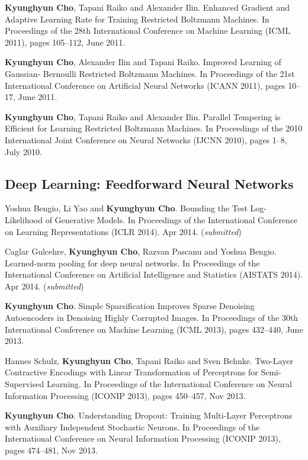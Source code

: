 \documentclass[11pt, oneside]{essay}
\begin{document}
\textbf{Kyunghyun Cho}, Tapani Raiko and Alexander Ilin. Enhanced
Gradient and Adaptive Learning Rate for Training
Restricted Boltzmann Machines. In Proceedings of the 28th
International Conference on Machine Learning (ICML 2011),
pages 105--112, June 2011.

\textbf{Kyunghyun Cho}, Alexander Ilin and Tapani Raiko. Improved
Learning of Gaussian- Bernoulli Restricted Boltzmann
Machines. In Proceedings of the 21st International
Conference on Artificial Neural Networks (ICANN 2011), pages
10--17, June 2011.

\textbf{Kyunghyun Cho}, Tapani Raiko and Alexander Ilin. Parallel
Tempering is Efficient for Learning Restricted Boltzmann
Machines. In Proceedings of the 2010 International Joint
Conference on Neural Networks (IJCNN 2010), pages 1--8, July
2010.



\subsection{Deep Learning: Feedforward Neural Networks}

Yoshua Bengio, Li Yao and \textbf{Kyunghyun Cho}. 
Bounding the Test Log-Likelihood of Generative Models. 
In Proceedings of the International Conference on Learning
Representations (ICLR 2014). Apr 2014. (\textit{submitted})

Caglar Gulcehre, \textbf{Kyunghyun Cho}, Razvan Pascanu and Yoshua Bengio.
Learned-norm pooling for deep neural networks. 
In Proceedings of the International Conference on Artificial
Intelligence and Statistics (AISTATS 2014). Apr 2014. (\textit{submitted})

\textbf{Kyunghyun Cho}. Simple Sparsification Improves Sparse
Denoising Autoencoders in Denoising Highly Corrupted Images.
In Proceedings of the 30th International Conference on
Machine Learning (ICML 2013), pages 432--440, June 2013.

Hannes Schulz, \textbf{Kyunghyun Cho}, Tapani Raiko and Sven Behnke.
Two-Layer Contractive Encodings with Linear Transformation
of Perceptrons for Semi-Supervised Learning. 
In Proceedings of the International Conference on Neural
Information Processing (ICONIP 2013), pages 450--457, Nov 2013.

\textbf{Kyunghyun Cho}.
Understanding Dropout: Training Multi-Layer Perceptrons with
Auxiliary Independent Stochastic Neurons. 
In Proceedings of the International Conference on Neural
Information Processing (ICONIP 2013), pages 474--481, Nov 2013.
\end{document}
